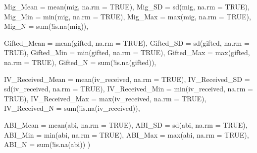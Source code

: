 \documentclass[
  letterpaper,
  DIV=11,
  numbers=noendperiod]{scrartcl}
\newenvironment{Shaded}{\begin{snugshade}}{\end{snugshade}}
\newcommand{\AttributeTok}[1]{\textcolor[rgb]{0.40,0.45,0.13}{#1}}
\newcommand{\ConstantTok}[1]{\textcolor[rgb]{0.56,0.35,0.01}{#1}}
\newcommand{\FunctionTok}[1]{\textcolor[rgb]{0.28,0.35,0.67}{#1}}
\newcommand{\NormalTok}[1]{\textcolor[rgb]{0.00,0.23,0.31}{#1}}
\newcommand{\SpecialCharTok}[1]{\textcolor[rgb]{0.37,0.37,0.37}{#1}}
\begin{document}
\begin{Shaded}
\begin{Highlighting}[]
    \AttributeTok{Mig\_Mean =} \FunctionTok{mean}\NormalTok{(mig, }\AttributeTok{na.rm =} \ConstantTok{TRUE}\NormalTok{),}
    \AttributeTok{Mig\_SD =} \FunctionTok{sd}\NormalTok{(mig, }\AttributeTok{na.rm =} \ConstantTok{TRUE}\NormalTok{),}
    \AttributeTok{Mig\_Min =} \FunctionTok{min}\NormalTok{(mig, }\AttributeTok{na.rm =} \ConstantTok{TRUE}\NormalTok{),}
    \AttributeTok{Mig\_Max =} \FunctionTok{max}\NormalTok{(mig, }\AttributeTok{na.rm =} \ConstantTok{TRUE}\NormalTok{),}
    \AttributeTok{Mig\_N =} \FunctionTok{sum}\NormalTok{(}\SpecialCharTok{!}\FunctionTok{is.na}\NormalTok{(mig)),}
    
    \AttributeTok{Gifted\_Mean =} \FunctionTok{mean}\NormalTok{(gifted, }\AttributeTok{na.rm =} \ConstantTok{TRUE}\NormalTok{),}
    \AttributeTok{Gifted\_SD =} \FunctionTok{sd}\NormalTok{(gifted, }\AttributeTok{na.rm =} \ConstantTok{TRUE}\NormalTok{),}
    \AttributeTok{Gifted\_Min =} \FunctionTok{min}\NormalTok{(gifted, }\AttributeTok{na.rm =} \ConstantTok{TRUE}\NormalTok{),}
    \AttributeTok{Gifted\_Max =} \FunctionTok{max}\NormalTok{(gifted, }\AttributeTok{na.rm =} \ConstantTok{TRUE}\NormalTok{),}
    \AttributeTok{Gifted\_N =} \FunctionTok{sum}\NormalTok{(}\SpecialCharTok{!}\FunctionTok{is.na}\NormalTok{(gifted)),}
    
    \AttributeTok{IV\_Received\_Mean =} \FunctionTok{mean}\NormalTok{(iv\_received, }\AttributeTok{na.rm =} \ConstantTok{TRUE}\NormalTok{),}
    \AttributeTok{IV\_Received\_SD =} \FunctionTok{sd}\NormalTok{(iv\_received, }\AttributeTok{na.rm =} \ConstantTok{TRUE}\NormalTok{),}
    \AttributeTok{IV\_Received\_Min =} \FunctionTok{min}\NormalTok{(iv\_received, }\AttributeTok{na.rm =} \ConstantTok{TRUE}\NormalTok{),}
    \AttributeTok{IV\_Received\_Max =} \FunctionTok{max}\NormalTok{(iv\_received, }\AttributeTok{na.rm =} \ConstantTok{TRUE}\NormalTok{),}
    \AttributeTok{IV\_Received\_N =} \FunctionTok{sum}\NormalTok{(}\SpecialCharTok{!}\FunctionTok{is.na}\NormalTok{(iv\_received)),}
    
    \AttributeTok{ABI\_Mean =} \FunctionTok{mean}\NormalTok{(abi, }\AttributeTok{na.rm =} \ConstantTok{TRUE}\NormalTok{),}
    \AttributeTok{ABI\_SD =} \FunctionTok{sd}\NormalTok{(abi, }\AttributeTok{na.rm =} \ConstantTok{TRUE}\NormalTok{),}
    \AttributeTok{ABI\_Min =} \FunctionTok{min}\NormalTok{(abi, }\AttributeTok{na.rm =} \ConstantTok{TRUE}\NormalTok{),}
    \AttributeTok{ABI\_Max =} \FunctionTok{max}\NormalTok{(abi, }\AttributeTok{na.rm =} \ConstantTok{TRUE}\NormalTok{),}
    \AttributeTok{ABI\_N =} \FunctionTok{sum}\NormalTok{(}\SpecialCharTok{!}\FunctionTok{is.na}\NormalTok{(abi))}
\NormalTok{  )}


\end{Highlighting}
\end{Shaded}
\end{document}
